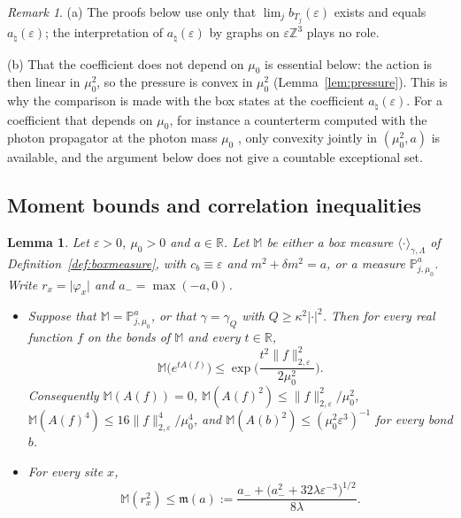 \documentclass[11pt]{amsart}
\theoremstyle{plain}
\newtheorem{lemma}[theorem]{Lemma}
\theoremstyle{definition}
\theoremstyle{remark}
\newtheorem{remark}[theorem]{Remark}
\numberwithin{equation}{section}
\newcommand{\R}{\mathbb{R}}
\newcommand{\Z}{\mathbb{Z}}
\newcommand{\eps}{\varepsilon}
\newcommand{\abs}[1]{\lvert #1\rvert}
\newcommand{\norm}[1]{\lVert #1\rVert}
\newcommand{\ev}[1]{\langle #1\rangle}
\begin{document}
\begin{remark}\label{rem:Hct}
(a) The proofs below use only that $\lim_jb_{T_j}(\eps)$ exists and equals $a_\natural(\eps)$; the interpretation of $a_\natural(\eps)$ by graphs on $\eps\Z^3$ plays no role.

(b) That the coefficient does not depend on $\mu_0$ is essential below: the action is then linear in $\mu_0^2$, so the pressure is convex in $\mu_0^2$ (Lemma~\ref{lem:pressure}). This is why the comparison is made with the box states at the coefficient $a_\natural(\eps)$. For a coefficient that depends on $\mu_0$, for instance a counterterm computed with the photon propagator at the photon mass $\mu_0$ \cite[Rem.~2.3(ii)]{v1}, only convexity jointly in $(\mu_0^2,a)$ is available, and the argument below does not give a countable exceptional set.
\end{remark}

\subsection{Moment bounds and correlation inequalities}

\begin{lemma}\label{lem:tor-moments}
Let $\eps>0$, $\mu_0>0$ and $a\in\R$. Let $\mathbb M$ be either a box measure $\ev\cdot_{\gamma,\Lambda}$ of Definition~\ref{def:boxmeasure}, with $c_b\equiv\eps$ and $m^2+\delta m^2=a$, or a measure $\mathbb P^a_{j,\mu_0}$. Write $r_x=\abs{\varphi_x}$ and $a_-=\max(-a,0)$.
\begin{itemize}
\item[(a)] Suppose that $\mathbb M=\mathbb P^a_{j,\mu_0}$, or that $\gamma=\gamma_Q$ with $Q\ge\kappa^2\abs\cdot^2$. Then for every real function $f$ on the bonds of $\mathbb M$ and every $t\in\R$,
\[
\mathbb M\big(e^{tA(f)}\big)\le\exp\Big(\frac{t^2\norm f^2_{2,\eps}}{2\mu_0^2}\Big).
\]
Consequently $\mathbb M(A(f))=0$, $\mathbb M(A(f)^2)\le\norm f_{2,\eps}^2/\mu_0^2$, $\mathbb M(A(f)^4)\le16\norm f_{2,\eps}^4/\mu_0^4$, and $\mathbb M(A(b)^2)\le(\mu_0^2\eps^3)^{-1}$ for every bond $b$.
\item[(b)] For every site $x$,
\[
\mathbb M(r_x^2)\le\mathfrak m(a):=\frac{a_-+\big(a_-^2+32\lambda\eps^{-3}\big)^{1/2}}{8\lambda} .
\]
\end{itemize}
\end{lemma}
\end{document}
